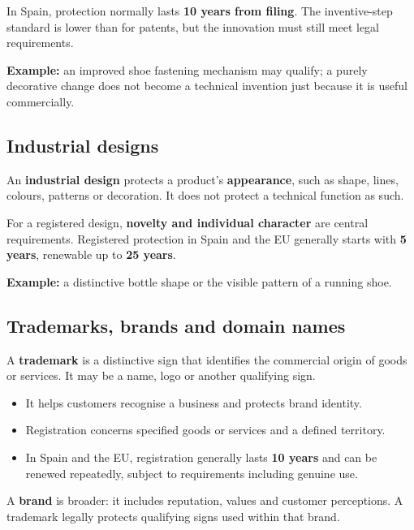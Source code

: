 \documentclass[12pt,a4paper]{report}
\newcommand{\tightlist}{}
\begin{document}
In Spain, protection normally lasts \textbf{10 years from filing}. The inventive-step standard is lower than for patents, but the innovation must still meet legal requirements.

\textbf{Example:} an improved shoe fastening mechanism may qualify; a purely decorative change does not become a technical invention just because it is useful commercially.

\hypertarget{industrial-designs}{%
\subsection{Industrial designs}\label{industrial-designs}}

An \textbf{industrial design} protects a product's \textbf{appearance}, such as shape, lines, colours, patterns or decoration. It does not protect a technical function as such.

For a registered design, \textbf{novelty and individual character} are central requirements. Registered protection in Spain and the EU generally starts with \textbf{5 years}, renewable up to \textbf{25 years}.

\textbf{Example:} a distinctive bottle shape or the visible pattern of a running shoe.

\hypertarget{trademarks-brands-and-domain-names}{%
\subsection{Trademarks, brands and domain names}\label{trademarks-brands-and-domain-names}}

A \textbf{trademark} is a distinctive sign that identifies the commercial origin of goods or services. It may be a name, logo or another qualifying sign.

\begin{itemize}
\tightlist
\item
  It helps customers recognise a business and protects brand identity.
\item
  Registration concerns specified goods or services and a defined territory.
\item
  In Spain and the EU, registration generally lasts \textbf{10 years} and can be renewed repeatedly, subject to requirements including genuine use.
\end{itemize}

A \textbf{brand} is broader: it includes reputation, values and customer perceptions. A trademark legally protects qualifying signs used within that brand.
\end{document}
